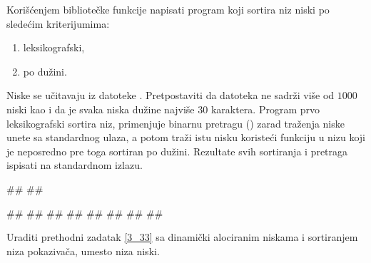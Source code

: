 \begin{Answer}[ref=3_32]
\end{Answer}
\begin{Exercise}[label=3_33]
   Korišćenjem bibliotečke funkcije  napisati program
   koji sortira niz niski po sledećim kriterijumima:
   \begin{enumerate}
   \item leksikografski,
   \item po dužini.
   \end{enumerate}
   Niske se učitavaju iz datoteke . Pretpostaviti da datoteka ne sadrži više od 
   $1000$ niski kao i da je svaka niska dužine najviše $30$ karaktera. Program prvo
   leksikografski sortira niz, primenjuje binarnu pretragu
   () zarad traženja niske unete sa standardnog ulaza,
   a potom traži istu nisku koristeći funkciju  u nizu koji je neposredno pre toga
   sortiran po dužini. Rezultate svih sortiranja
   i pretraga ispisati na standardnom izlazu.

   
\begin{maxitest}
\begin{upotreba}{1}
##
##
  
#\naslovInt#
##
##
##
##
##
##
##
\end{upotreba}
\end{maxitest}
  
\end{Exercise}

\begin{Answer}[ref=3_33]
\end{Answer}
\begin{Exercise}[label=3_34]
  Uraditi prethodni zadatak \ref{3_33} sa dinamički alociranim niskama
  i sortiranjem niza pokazivača, umesto niza niski.
  
\end{Exercise}


